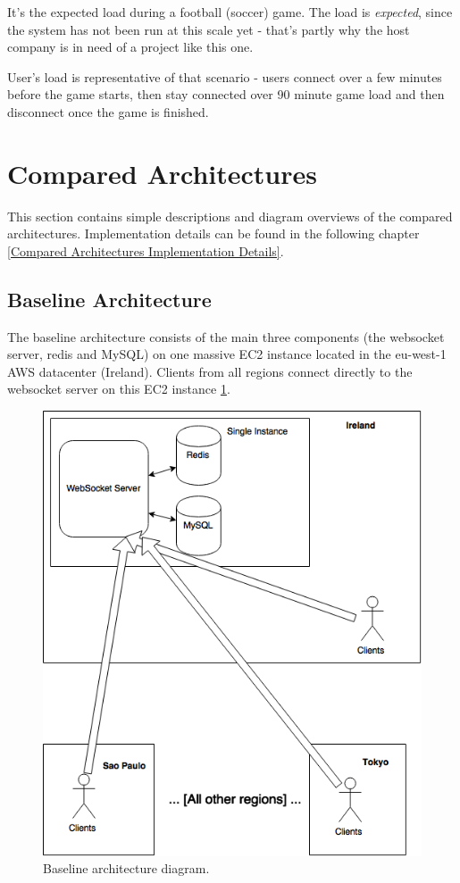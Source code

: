 \documentclass{uvamscse}
\begin{document}
It's the expected load during a football (soccer) game. The load is \textit{expected}, since the system has not been run at this scale yet - that's partly why the host company is in need of a project like this one.

User's load is representative of that scenario - users connect over a few minutes before the game starts, then stay connected over 90 minute game load and then disconnect once the game is finished.

\section{Compared Architectures}\label{Compared Architectures}

This section contains simple descriptions and diagram overviews of the compared architectures. Implementation details can be found in the following chapter \ref{Compared Architectures Implementation Details}.

\subsection{Baseline Architecture}\label{Baseline Architecture}
The baseline architecture consists of the main three components (the websocket server, redis and MySQL) on one massive EC2 instance located in the eu-west-1 AWS datacenter (Ireland). Clients from all regions connect directly to the websocket server on this EC2 instance \ref{figure:baseline}.

\begin{figure}[H]
\centering
\includegraphics[scale=0.3]{baseline}
\caption{Baseline architecture diagram.}
\label{figure:baseline}
\end{figure}
\end{document}

